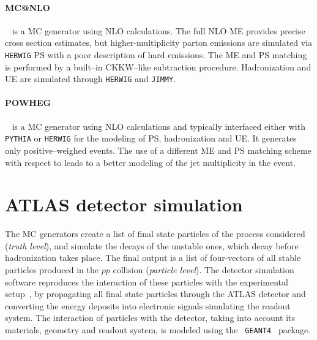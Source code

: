 \paragraph{MC@NLO}~\cite{mcatnlo} is a MC generator using NLO
calculations. The full NLO ME provides precise cross section
estimates, but higher-multiplicity parton emissions are simulated via
\texttt{HERWIG} PS with a poor description of hard emissions. The ME
and PS matching is performed by a built--in CKKW--like subtraction
procedure.
Hadronization and UE are simulated through \texttt{HERWIG} and
\texttt{JIMMY}.

\paragraph{POWHEG}~\cite{powheg} is a MC generator using NLO
calculations and typically interfaced either with \texttt{PYTHIA} or
\texttt{HERWIG} for the modeling of PS, hadronization and UE. It
generates only positive--weighed events. The use of a different ME and
PS matching scheme with respect to \mcatnlo{} leads to a better
modeling of the jet multiplicity in the event. 

\section{ATLAS detector simulation}
\label{sec:detectorsim}

The MC generators create a list of final state particles of the
process considered ({\it truth level}), and simulate the decays of the
unstable ones, which decay before hadronization takes place. 
The final output is a list of four-vectors of all stable
particles produced in the $pp$ collision ({\it particle level}). 
The detector simulation software reproduces the interaction of these
particles with the experimental setup~\cite{atlas_sim}, by propagating
all final state particles through the ATLAS detector and converting
the energy deposits into electronic signals simulating the readout
system. 
The interaction of particles with the detector, taking into account
its materials, geometry and readout system, is modeled using the {\tt
  GEANT4}~\cite{geant} package.

